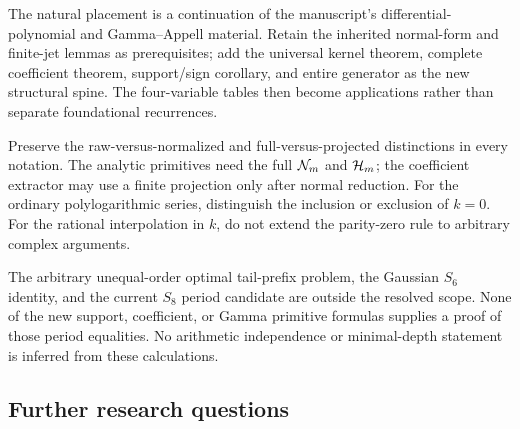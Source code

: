 \documentclass[11pt,letterpaper]{article}
\numberwithin{equation}{section}
\theoremstyle{plain}
\theoremstyle{definition}
\theoremstyle{remark}
\begin{document}
The natural placement is a continuation of the manuscript's differential-polynomial and Gamma--Appell material. Retain the inherited normal-form and finite-jet lemmas as prerequisites; add the universal kernel theorem, complete coefficient theorem, support/sign corollary, and entire generator as the new structural spine. The four-variable tables then become applications rather than separate foundational recurrences.

Preserve the raw-versus-normalized and full-versus-projected distinctions in every notation. The analytic primitives need the full $\mathcal N_m$ and $\mathcal H_m$; the coefficient extractor may use a finite projection only after normal reduction. For the ordinary polylogarithmic series, distinguish the inclusion or exclusion of $k=0$. For the rational interpolation in $k$, do not extend the parity-zero rule to arbitrary complex arguments.

The arbitrary unequal-order optimal tail-prefix problem, the Gaussian $S_6$ identity, and the current $S_8$ period candidate are outside the resolved scope. None of the new support, coefficient, or Gamma primitive formulas supplies a proof of those period equalities. No arithmetic independence or minimal-depth statement is inferred from these calculations.

\subsection{Further research questions}
\end{document}
